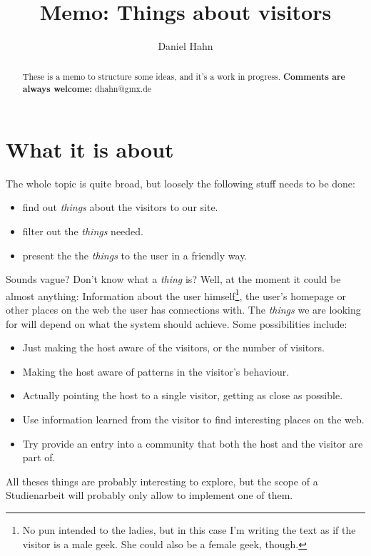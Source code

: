 \documentclass[a4paper]{danarticle}
\begin{document}
  \author{Daniel Hahn}
  \title{Memo: Things about visitors}
  \maketitle
 
  \begin{abstract}
     These is a memo to structure some ideas, and it's a work in 
     progress. \textbf{Comments are always welcome:} dhahn@gmx.de
  \end{abstract}
 
  \section*{What it is about}
    The whole topic is quite broad, but loosely the following stuff needs to be
    done:
    \begin{itemize}
      \item{find out \textit{things} about the visitors to our site.}
      \item{filter out the \textit{things} needed.}
      \item{present the the \textit{things} to the user in a friendly way.}
    \end{itemize} 
    Sounds vague? Don't know what a \textit{thing} is? Well, at the moment it
    could be almost anything: Information about the user himself\footnote{No pun
    intended to the ladies, but in this case I'm writing the text as if the
    visitor is a male geek. She could also be a female geek, though.}, the user's
    homepage or other places on the web the user has connections with.
    The \textit{things} we are looking for will depend on what the system
    should achieve. Some possibilities include:
    \begin{itemize}
       \item{Just making the host aware of the visitors, or the number of
             visitors.}
       \item{Making the host aware of patterns in the visitor's behaviour.}
       \item{Actually pointing the host to a single visitor, getting as close
             as possible.}
       \item{Use information learned from the visitor to find interesting
             places on the web.}
       \item{Try provide an entry into a community that both the host and
             the visitor are part of.}
    \end{itemize}
    All theses things are probably interesting to explore, but the scope of a
    Studienarbeit will probably only allow to implement one of them.
\end{document}
